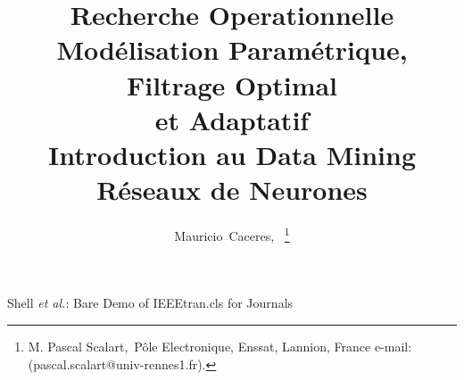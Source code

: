 \documentclass[journal]{IEEEtran}
\begin{document}
%
\title{Recherche Operationnelle\\Modélisation Paramétrique,
	Filtrage Optimal\\ et Adaptatif\\Introduction au Data Mining
	Réseaux de Neurones
}
%
%
%

\author{Mauricio~Caceres,~
\thanks{M. Pascal Scalart,~Pôle Electronique, Enssat, Lannion,
France  e-mail: (pascal.scalart@univ-rennes1.fr).}}%

% 
%



%
{Shell \MakeLowercase{\textit{et al.}}: Bare Demo of IEEEtran.cls for Journals}
% 
\end{document}
